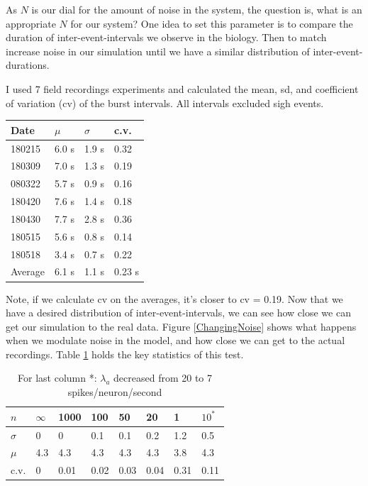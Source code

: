 \documentclass[12pt]{article}
\begin{document}
As $N$ is our dial for the amount of noise in the system, the question is, what is an appropriate $N$ for our system? One idea to set this parameter is to compare the duration of inter-event-intervals we observe in the biology. Then to match increase noise in our simulation until we have a similar distribution of inter-event-durations.

I used 7 field recordings experiments and calculated the mean, sd, and coefficient of variation (cv) of the burst intervals. All intervals excluded sigh events.


\begin{table}[h!]
\center
\begin{tabular}{|l|l|l|l|}
\hline
Date    & $\mu$ & $\sigma$ & c.v. \\ \hline
180215  & 6.0 s& 1.9 s   & 0.32 \\ \hline
180309  & 7.0 s& 1.3 s   & 0.19 \\ \hline
080322  & 5.7 s& 0.9 s   & 0.16 \\ \hline
180420  & 7.6 s& 1.4 s   & 0.18 \\ \hline
180430  & 7.7 s& 2.8 s   & 0.36 \\ \hline
180515  & 5.6 s& 0.8 s   & 0.14 \\ \hline
180518  & 3.4 s& 0.7 s   & 0.22 \\ \hline
\rowcolor[HTML]{9AFF99} 
Average & 6.1 s& 1.1 s    & 0.23 s \\ \hline
\end{tabular}
\end{table}

Note, if we calculate cv on the averages, it's closer to cv = 0.19. Now that we have a desired distribution of inter-event-intervals, we can see how close we can get our simulation to the real data. Figure \ref{ChangingNoise} shows what happens when we modulate noise in the model, and how close we can get to the actual recordings. Table \ref{ChangingNoiseTable} holds the key statistics of this test.

\begin{table}[h!]
\center
\begin{tabular}{|l|l|l|l|l|l|l|l|}
\hline
$n$      & $\infty$ & 1000 & 100  & 50   & 20   & 1    & $10^*$ \\ \hline
$\sigma$ & 0        & 0    & 0.1  & 0.1  & 0.2  & 1.2  & 0.5    \\ \hline
$\mu$    & 4.3      & 4.3  & 4.3  & 4.3  & 4.3  & 3.8  & 4.3    \\ \hline
c.v.     & 0        & 0.01 & 0.02 & 0.03 & 0.04 & 0.31 & 0.11   \\ \hline
\end{tabular}
\caption{For last column *: $\lambda_a$ decreased from 20 to 7 spikes/neuron/second}
\label{ChangingNoiseTable}
\end{table}
\end{document}
